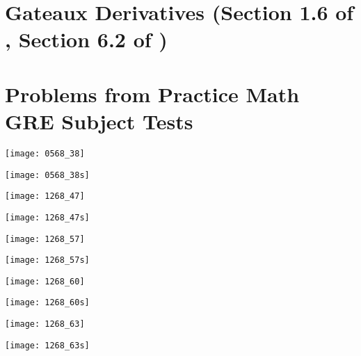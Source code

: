 %
%
%
%
%
%
%
%

\section{Gateaux Derivatives (Section 1.6 of \citet{koroljuk1994theory}, Section 6.2 of \citet{serfling1980})}


\section{Problems from Practice Math GRE Subject Tests}

%

\texttt{[image: 0568\_38]}

\texttt{[image: 0568\_38s]}

\texttt{[image: 1268\_47]}

\texttt{[image: 1268\_47s]}

\texttt{[image: 1268\_57]}

\texttt{[image: 1268\_57s]}

\texttt{[image: 1268\_60]}

\texttt{[image: 1268\_60s]}

\texttt{[image: 1268\_63]}

\texttt{[image: 1268\_63s]}

%
%
%
%
%
%
%
%

%
%
%
%